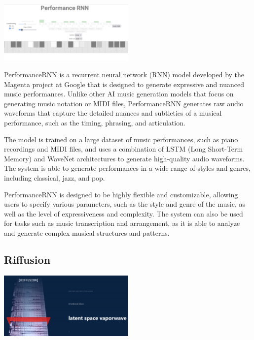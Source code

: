 \documentclass[]{MSword}
\begin{document}
\begin{center}
  \includegraphics[width=0.5\textwidth]{img/performancernn.png}
\end{center}

\par{PerformanceRNN\cite{performancernn} is a recurrent neural network (RNN) model developed by the Magenta project at Google that is designed to generate expressive and nuanced music performances. Unlike other AI music generation models that focus on generating music notation or MIDI files, PerformanceRNN generates raw audio waveforms that capture the detailed nuances and subtleties of a musical performance, such as the timing, phrasing, and articulation.}

\par{The model is trained on a large dataset of music performances, such as piano recordings and MIDI files, and uses a combination of LSTM (Long Short-Term Memory) and WaveNet architectures to generate high-quality audio waveforms. The system is able to generate performances in a wide range of styles and genres, including classical, jazz, and pop.}

\par{PerformanceRNN is designed to be highly flexible and customizable, allowing users to specify various parameters, such as the style and genre of the music, as well as the level of expressiveness and complexity. The system can also be used for tasks such as music transcription and arrangement, as it is able to analyze and generate complex musical structures and patterns.}

\subsection*{Riffusion}

\begin{center}
  \includegraphics[width=0.5\textwidth]{img/riffusion.png}
\end{center}
\end{document}
